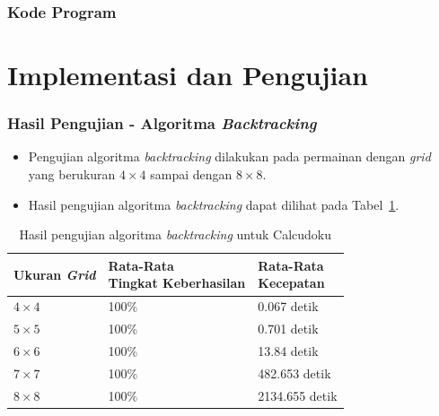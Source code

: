 \documentclass{beamer}
\begin{document}
\begin{frame}
\frametitle{Kode Program}
\end{frame}

\note{

}

\section{Implementasi dan Pengujian}

\begin{frame}
\frametitle{Hasil Pengujian - Algoritma \textit{Backtracking}}
\begin{itemize}
\item Pengujian algoritma \textit{backtracking} dilakukan pada permainan dengan \textit{grid} yang berukuran \begin{math}4 \times 4\end{math} sampai dengan \begin{math}8 \times 8\end{math}.
\item Hasil pengujian algoritma \textit{backtracking} dapat dilihat pada Tabel~\ref{tab:pengujianbt}.
\end{itemize}
\begin{table}
\tiny
\centering
\captionsetup{justification=centering}
\caption[Hasil pengujian algoritma \textit{backtracking} untuk Calcudoku]{Hasil pengujian algoritma \textit{backtracking} untuk Calcudoku}
\begin{tabular}{| l | l | l |}
\hline
Ukuran \textit{Grid} & \makecell[c]{Rata-Rata \\ Tingkat Keberhasilan} & \makecell[c]{Rata-Rata \\ Kecepatan} \\
\hline \hline
\begin{math}4 \times 4\end{math} & 100\% & 0.067 detik \\
\hline
\begin{math}5 \times 5\end{math} & 100\% & 0.701 detik \\
\hline
\begin{math}6 \times 6\end{math} & 100\% & 13.84 detik \\
\hline
\begin{math}7 \times 7\end{math} & 100\% & 482.653 detik \\
\hline
\begin{math}8 \times 8\end{math} & 100\% & 2134.655 detik \\
\hline
\end{tabular}
\label{tab:pengujianbt}
\end{table}
\end{frame}
\end{document}
